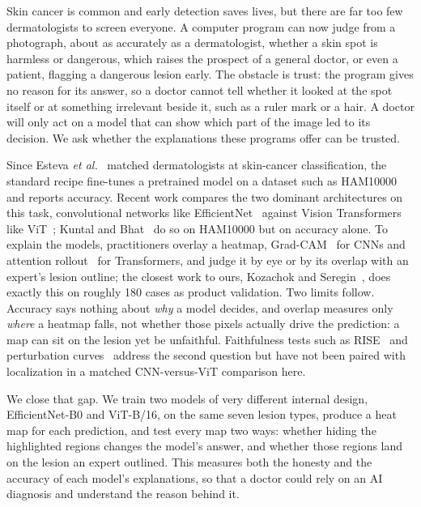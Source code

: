 \documentclass[10pt,twocolumn,letterpaper]{article}
\providecommand{\etal}{\textit{et al.}}
\begin{document}
Skin cancer is common and early detection saves lives, but there are far too few
dermatologists to screen everyone. A computer program can now judge from a
photograph, about as accurately as a dermatologist, whether a skin spot is
harmless or dangerous, which raises the prospect of a general doctor, or even a
patient, flagging a dangerous lesion early. The obstacle is trust: the program
gives no reason for its answer, so a doctor cannot tell whether it looked at the
spot itself or at something irrelevant beside it, such as a ruler mark or a hair.
A doctor will only act on a model that can show which part of the image led to
its decision. We ask whether the explanations these programs offer can be
trusted.

Since Esteva \etal~\cite{esteva2017dermatologist} matched dermatologists at
skin-cancer classification, the standard recipe fine-tunes a pretrained model on
a dataset such as HAM10000~\cite{tschandl2018ham10000} and reports accuracy.
Recent work compares the two dominant architectures on this task, convolutional
networks like EfficientNet~\cite{tan2019efficientnet} against Vision Transformers
like ViT~\cite{dosovitskiy2021vit}; Kuntal and Bhat~\cite{kuntal2025bridging} do
so on HAM10000 but on accuracy alone. To explain the models, practitioners
overlay a heatmap, Grad-CAM~\cite{selvaraju2017gradcam} for CNNs and attention
rollout~\cite{abnar2020attention} for Transformers, and judge it by eye or by its
overlap with an expert's lesion outline; the closest work to ours, Kozachok and
Seregin~\cite{kozachok2026melanoscope}, does exactly this on roughly 180 cases as
product validation. Two limits follow. Accuracy says nothing about \emph{why} a
model decides, and overlap measures only \emph{where} a heatmap falls, not
whether those pixels actually drive the prediction: a map can sit on the lesion
yet be unfaithful. Faithfulness tests such as RISE~\cite{petsiuk2018rise} and
perturbation curves~\cite{samek2017evaluating} address the second question but
have not been paired with localization in a matched CNN-versus-ViT comparison
here.

We close that gap. We train two models of very different internal design,
EfficientNet-B0 and ViT-B/16, on the same seven lesion types, produce a heat map
for each prediction, and test every map two ways: whether hiding the highlighted
regions changes the model's answer, and whether those regions land on the lesion
an expert outlined. This measures both the honesty and the accuracy of each
model's explanations, so that a doctor could rely on an AI diagnosis and
understand the reason behind it.
\end{document}
